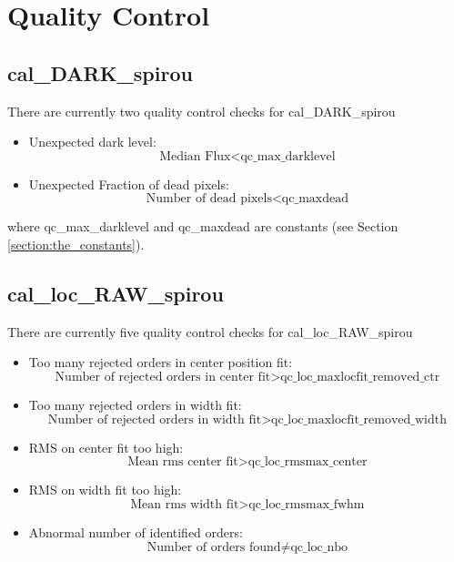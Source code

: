  \chapter{Quality Control}


\section{cal\_DARK\_spirou}
\label{section:qc_cal_DARK_spirou}

There are currently two quality control checks for cal\_DARK\_spirou
\begin{itemize}
\item Unexpected dark level: 
	\begin{equation}
	\text{Median Flux} < \text{qc\_max\_darklevel}
	\end{equation}

\item Unexpected Fraction of dead pixels: 
	\begin{equation}
	\text{Number of dead pixels} < \text{qc\_maxdead}
	\end{equation}
\end{itemize}

\noindent where qc\_max\_darklevel and qc\_maxdead are constants (see Section \ref{section:the_constants}).

\section{cal\_loc\_RAW\_spirou}
\label{section:qc_cal_loc_RAW_spirou}

There are currently five quality control checks for cal\_loc\_RAW\_spirou
\begin{itemize}
\item Too many rejected orders in center position fit: 
	\begin{equation}
	\text{Number of rejected orders in center fit} >\text{qc\_loc\_maxlocfit\_removed\_ctr}
	\end{equation}
\item Too many rejected orders in width fit: 
	\begin{equation}
	\text{Number of rejected orders in width fit} >\text{qc\_loc\_maxlocfit\_removed\_width}
	\end{equation}
\item RMS on center fit too high: 
	\begin{equation}
	\text{Mean rms center fit} > \text{qc\_loc\_rmsmax\_center}
	\end{equation}
\item RMS on width fit too high: 
	\begin{equation}
	\text{Mean rms width fit} > \text{qc\_loc\_rmsmax\_fwhm}
	\end{equation}
\item Abnormal number of identified orders: 
	\begin{equation}
	\text{Number of orders found} \neq \text{qc\_loc\_nbo}
	\end{equation}
\end{itemize}


